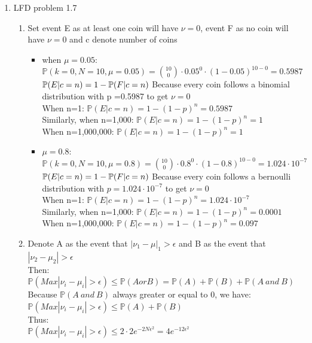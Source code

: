 \documentclass[12pt]{article}
\begin{document}
\begin{enumerate}
 \item LFD problem 1.7
  \begin{enumerate}
    \item
    Set event E as at least one coin will have $\nu =0$, event F as no coin will have $\nu =0 $ and c denote number of coins
    \begin{itemize}
      \item when $\mu =0.05$:\\
      $\mathbb{P}(k=0,N=10,\mu=0.05)={10\choose 0}\cdot 0.05^0 \cdot (1-0.05)^{10-0} = 0.5987$ \\
       $\mathbb{P}(E|c=n) = 1-\mathbb{P}(F|c=n) \\ $ Because every coin follows a binomial distribution with p =0.5987 to get $\nu =0$ \\
       When n=1: $\mathbb{P}(E|c=n) = 1- (1-p)^n =0.5987 $ \\
       Similarly, when n=1,000: $\mathbb{P}(E|c=n) = 1- (1-p)^n =1 $ \\
       When n=1,000,000: $\mathbb{P}(E|c=n) = 1- (1-p)^n =1 $ \\
      \item $\mu =0.8$:\\
      $\mathbb{P}(k=0,N=10,\mu=0.8)= {10\choose0} \cdot 0.8^0 \cdot (1-0.8)^{10-0} = 1.024 \cdot 10^{-7}$ \\
      $\mathbb{P}(E|c=n) = 1-\mathbb{P}(F|c=n) \\ $ Because every coin follows a bernoulli distribution with $p =1.024 \cdot 10^{-7}$ to get $\nu =0$ \\
       When n=1: $\mathbb{P}(E|c=n) = 1- (1-p)^n = 1.024 \cdot 10^{-7} $ \\
       Similarly, when n=1,000: $\mathbb{P}(E|c=n) = 1- (1-p)^n =0.0001 $ \\
       When n=1,000,000: $\mathbb{P}(E|c=n) = 1- (1-p)^n =0.097 $ \\
    \end{itemize}
    \item
    Denote A as the event that $| \nu_1 -\mu|_1 > \epsilon$ and B as the event that $| \nu_2 -\mu_2| > \epsilon$ \\
    Then: \\ $\mathbb{P}(Max|\nu_i-\mu_i|> \epsilon) \leq \mathbb{P}(A or B) = \mathbb{P}(A)+\mathbb{P}(B)+ \mathbb{P}(A~ and~B)$ \\
    Because $\mathbb{P}(A~ and~B)$ always greater or equal to 0, we have:\\ $\mathbb{P}(Max|\nu_i-\mu_i|> \epsilon) \leq \mathbb{P}(A)+\mathbb{P}(B)$ \\
    Thus:\\  $\mathbb{P}(Max|\nu_i-\mu_i|> \epsilon) \leq 2\cdot 2e^{-2N\epsilon^2}=4e^{-12\epsilon^2}$
  \end{enumerate}
  

\end{enumerate}
\end{document}
